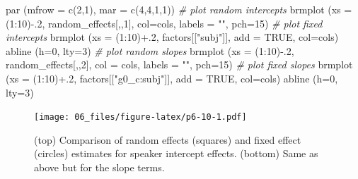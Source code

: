 \documentclass[
]{book}
\newenvironment{Shaded}{\begin{snugshade}}{\end{snugshade}}
\newcommand{\AttributeTok}[1]{\textcolor[rgb]{0.77,0.63,0.00}{#1}}
\newcommand{\CommentTok}[1]{\textcolor[rgb]{0.56,0.35,0.01}{\textit{#1}}}
\newcommand{\ConstantTok}[1]{\textcolor[rgb]{0.00,0.00,0.00}{#1}}
\newcommand{\DecValTok}[1]{\textcolor[rgb]{0.00,0.00,0.81}{#1}}
\newcommand{\FunctionTok}[1]{\textcolor[rgb]{0.00,0.00,0.00}{#1}}
\newcommand{\NormalTok}[1]{#1}
\newcommand{\SpecialCharTok}[1]{\textcolor[rgb]{0.00,0.00,0.00}{#1}}
\newcommand{\StringTok}[1]{\textcolor[rgb]{0.31,0.60,0.02}{#1}}
\begin{document}
\begin{Shaded}
\begin{Highlighting}[]
\FunctionTok{par}\NormalTok{ (}\AttributeTok{mfrow =} \FunctionTok{c}\NormalTok{(}\DecValTok{2}\NormalTok{,}\DecValTok{1}\NormalTok{), }\AttributeTok{mar =} \FunctionTok{c}\NormalTok{(}\DecValTok{4}\NormalTok{,}\DecValTok{4}\NormalTok{,}\DecValTok{1}\NormalTok{,}\DecValTok{1}\NormalTok{))}
\CommentTok{\# plot random intercepts}
\FunctionTok{brmplot}\NormalTok{ (}\AttributeTok{xs =}\NormalTok{ (}\DecValTok{1}\SpecialCharTok{:}\DecValTok{10}\NormalTok{)}\SpecialCharTok{{-}}\NormalTok{.}\DecValTok{2}\NormalTok{,  random\_effects[,,}\DecValTok{1}\NormalTok{], }\AttributeTok{col=}\NormalTok{cols, }\AttributeTok{labels =} \StringTok{""}\NormalTok{, }\AttributeTok{pch=}\DecValTok{15}\NormalTok{)}
\CommentTok{\# plot fixed intercepts}
\FunctionTok{brmplot}\NormalTok{ (}\AttributeTok{xs =}\NormalTok{ (}\DecValTok{1}\SpecialCharTok{:}\DecValTok{10}\NormalTok{)}\SpecialCharTok{+}\NormalTok{.}\DecValTok{2}\NormalTok{, factors[[}\StringTok{"subj"}\NormalTok{]], }\AttributeTok{add =} \ConstantTok{TRUE}\NormalTok{, }\AttributeTok{col=}\NormalTok{cols)}
\FunctionTok{abline}\NormalTok{ (}\AttributeTok{h=}\DecValTok{0}\NormalTok{, }\AttributeTok{lty=}\DecValTok{3}\NormalTok{)}
\CommentTok{\# plot random slopes}
\FunctionTok{brmplot}\NormalTok{ (}\AttributeTok{xs =}\NormalTok{ (}\DecValTok{1}\SpecialCharTok{:}\DecValTok{10}\NormalTok{)}\SpecialCharTok{{-}}\NormalTok{.}\DecValTok{2}\NormalTok{, random\_effects[,,}\DecValTok{2}\NormalTok{], }\AttributeTok{col =}\NormalTok{ cols, }\AttributeTok{labels =} \StringTok{""}\NormalTok{, }\AttributeTok{pch=}\DecValTok{15}\NormalTok{)}
\CommentTok{\# plot fixed slopes}
\FunctionTok{brmplot}\NormalTok{ (}\AttributeTok{xs =}\NormalTok{ (}\DecValTok{1}\SpecialCharTok{:}\DecValTok{10}\NormalTok{)}\SpecialCharTok{+}\NormalTok{.}\DecValTok{2}\NormalTok{, factors[[}\StringTok{"g0\_c:subj"}\NormalTok{]], }\AttributeTok{add =} \ConstantTok{TRUE}\NormalTok{, }\AttributeTok{col=}\NormalTok{cols)}
\FunctionTok{abline}\NormalTok{ (}\AttributeTok{h=}\DecValTok{0}\NormalTok{, }\AttributeTok{lty=}\DecValTok{3}\NormalTok{)}
\end{Highlighting}
\end{Shaded}

\begin{figure}
\centering
\texttt{[image: 06\_files/figure-latex/p6-10-1.pdf]}
\caption{\label{fig:p6-10}(top) Comparison of random effects (squares) and fixed effect (circles) estimates for speaker intercept effects. (bottom) Same as above but for the slope terms.}
\end{figure}
\end{document}
